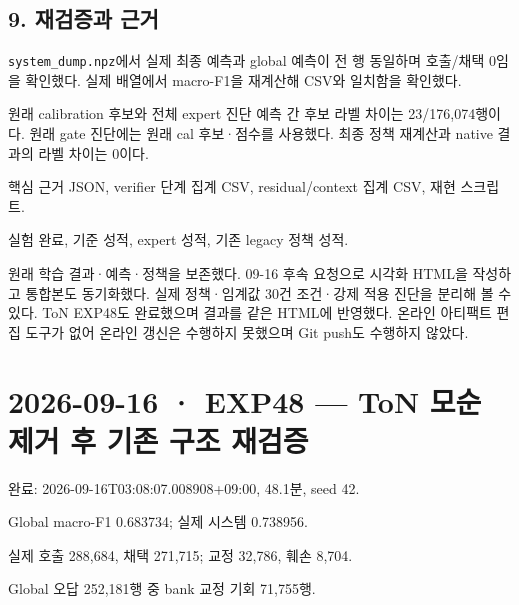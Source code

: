 \subsection{9. 재검증과 근거}
\par\noindent \textbullet\enspace \texttt{system\_\allowbreak{}\allowbreak{}d\allowbreak{}ump.\allowbreak{}npz}에서 실제 최종 예측과 global 예측이 전 행 동일하며 호출/\allowbreak{}채택 0임을 확인했다. 실제 배열에서 macro-F1을 재계산해 CSV와 일치함을 확인했다.


\par\noindent \textbullet\enspace 원래 calibration 후보와 전체 expert 진단 예측 간 후보 라벨 차이는 23/\allowbreak{}176,074행이다. 원래 gate 진단에는 원래 cal 후보·점수를 사용했다. 최종 정책 재계산과 native 결과의 라벨 차이는 0이다.


\par\noindent \textbullet\enspace 핵심 근거 JSON, verifier 단계 집계 CSV, residual/\allowbreak{}context 집계 CSV, 재현 스크립트.


\par\noindent \textbullet\enspace 실험 완료, 기준 성적, expert 성적, 기존 legacy 정책 성적.


원래 학습 결과·예측·정책을 보존했다. 09-16 후속 요청으로 시각화 HTML을 작성하고 통합본도 동기화했다. 실제 정책·임계값 30건 조건·강제 적용 진단을 분리해 볼 수 있다. ToN EXP48도 완료했으며 결과를 같은 HTML에 반영했다. 온라인 아티팩트 편집 도구가 없어 온라인 갱신은 수행하지 못했으며 Git push도 수행하지 않았다.



\section{2026-09-16 · EXP48 — ToN 모순 제거 후 기존 구조 재검증}
\label{report:20260916_exp48_results}
완료: 2026-09-16T03:08:07.008908+\allowbreak{}09:00, 48.1분, seed 42.

\par\noindent \textbullet\enspace Global macro-F1 0.683734; 실제 시스템 0.738956.


\par\noindent \textbullet\enspace 실제 호출 288,684, 채택 271,715; 교정 32,786, 훼손 8,704.


\par\noindent \textbullet\enspace Global 오답 252,181행 중 bank 교정 기회 71,755행.


